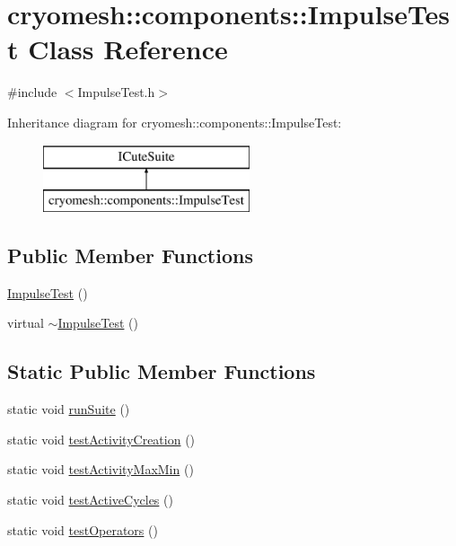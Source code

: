\hypertarget{classcryomesh_1_1components_1_1_impulse_test}{
\section{cryomesh::components::ImpulseTest Class Reference}
\label{classcryomesh_1_1components_1_1_impulse_test}
}


{\ttfamily \#include $<$ImpulseTest.h$>$}

Inheritance diagram for cryomesh::components::ImpulseTest:\begin{figure}[H]
\begin{center}
\leavevmode
\includegraphics[height=2.000000cm]{classcryomesh_1_1components_1_1_impulse_test}
\end{center}
\end{figure}
\subsection*{Public Member Functions}
\begin{DoxyCompactItemize}
\item 
\hyperlink{classcryomesh_1_1components_1_1_impulse_test_adcf8973dc76591a1fdf27dee6e9c18e1}{ImpulseTest} ()
\item 
virtual \hyperlink{classcryomesh_1_1components_1_1_impulse_test_af6e2a24a4795115f5fa205612845fd61}{$\sim$ImpulseTest} ()
\end{DoxyCompactItemize}
\subsection*{Static Public Member Functions}
\begin{DoxyCompactItemize}
\item 
static void \hyperlink{classcryomesh_1_1components_1_1_impulse_test_a3650059bffacf3cc31c840e00a77f80e}{runSuite} ()
\item 
static void \hyperlink{classcryomesh_1_1components_1_1_impulse_test_a048013cfdeba94c1587fcbc8e992ec70}{testActivityCreation} ()
\item 
static void \hyperlink{classcryomesh_1_1components_1_1_impulse_test_ab67967fa81e21598294119f8e0095481}{testActivityMaxMin} ()
\item 
static void \hyperlink{classcryomesh_1_1components_1_1_impulse_test_a4ccfa7131ff634e9da8b42d9a1ce1206}{testActiveCycles} ()
\item 
static void \hyperlink{classcryomesh_1_1components_1_1_impulse_test_a8c6afd6637b1fadedf6986c6ddb60b38}{testOperators} ()
\end{DoxyCompactItemize}


